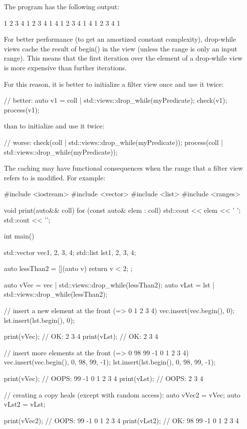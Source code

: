 The program has the following output:

\begin{shell}
1 2 3 4 1 2 3 4 1
4 1 2 3 4 1
4 1 2 3 4 1
\end{shell}


For better performance (to get an amortized constant complexity), drop-while views cache the result of begin() in the view (unless the range is only an input range). This means that the first iteration over the element of a drop-while view is more expensive than further iterations.

For this reason, it is better to initialize a filter view once and use it twice:

\begin{cpp}
// better:
auto v1 = coll | std::views::drop_while(myPredicate);
check(v1);
process(v1);
\end{cpp}

than to initialize and use it twice:

\begin{cpp}
// worse:
check(coll | std::views::drop_while(myPredicate));
process(coll | std::views::drop_while(myPredicate));
\end{cpp}

The caching may have functional consequences when the range that a filter view refers to is modified. For example:


\begin{cpp}
#include <iostream>
#include <vector>
#include <list>
#include <ranges>

void print(auto&& coll)
{
	for (const auto& elem : coll) {
		std::cout << elem << ' ';
	}
	std::cout << '\n';
}

int main()
{
	std::vector vec{1, 2, 3, 4};
	std::list lst{1, 2, 3, 4};
	
	auto lessThan2 = [](auto v){
		return v < 2;
	};
	
	auto vVec = vec | std::views::drop_while(lessThan2);
	auto vLst = lst | std::views::drop_while(lessThan2);
	
	// insert a new element at the front (=> 0 1 2 3 4)
	vec.insert(vec.begin(), 0);
	lst.insert(lst.begin(), 0);
	
	print(vVec); // OK: 2 3 4
	print(vLst); // OK: 2 3 4
	
	// insert more elements at the front (=> 0 98 99 -1 0 1 2 3 4)
	vec.insert(vec.begin(), {0, 98, 99, -1});
	lst.insert(lst.begin(), {0, 98, 99, -1});
	
	print(vVec); // OOPS: 99 -1 0 1 2 3 4
	print(vLst); // OOPS: 2 3 4
	
	// creating a copy heals (except with random access):
	auto vVec2 = vVec;
	auto vLst2 = vLst;
	
	print(vVec2); // OOPS: 99 -1 0 1 2 3 4
	print(vLst2); // OK: 98 99 -1 0 1 2 3 4
}
\end{cpp}

